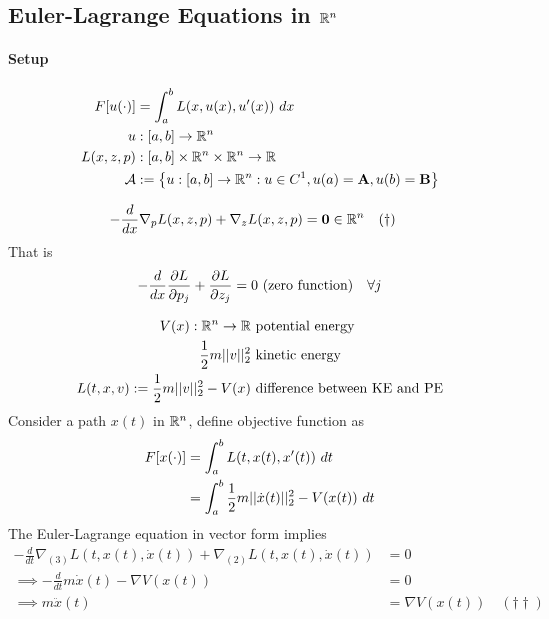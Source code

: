 \documentclass{article}
\begin{document}
	\subsection{Euler-Lagrange Equations in $\mathbb{R}^n$}
	\paragraph{Setup}
	\begin{align}
		F[u(\cdot)] &= \int_a^b L(x, u(x), u'(x))\ dx \\
		u &: [a, b] \to \mathbb{R}^n \\
		L(x, z, p) &: [a, b] \times \mathbb{R}^n \times \mathbb{R}^n \to \mathbb{R} \\
		\mathcal{{A}} &:= \left\{
			u: [a, b] \to \mathbb{R}^n: u \in C^1, u(a) = \textbf{A}, u(b) = \textbf{B}
		\right\}
	\end{align}

	\begin{theorem}
		\begin{align}
			- \frac{d}{dx} \nabla_p L(x, z, p) + \nabla_z L(x, z, p) &= \textbf{0} \in \mathbb{R}^n \quad (\dagger)
		\end{align}
		That is
		\begin{align}
			- \frac{d}{dx}\frac{\partial{L}}{\partial{p_j}} + \frac{\partial{L}}{\partial{z_j}} = 0\text{{ (zero function)}}\quad \forall j
		\end{align}
	\end{theorem}
	
	\begin{example}
		\begin{align}
			V(x): \mathbb{R}^n \to \mathbb{R} &\text{{ potential energy}} \\
			\frac{1}{2} m \vert \vert {v} \vert \vert_2^2 &\text{{ kinetic energy}} \\
			L(t, x, v):= \frac{1}{2} m \vert \vert {v} \vert \vert_2^2 - V(x) &\text{{ difference between KE and PE}}
		\end{align}
		Consider a path $x(t)$ in $\mathbb{R}^n$, define objective function as
		\begin{align}
			F[x(\cdot)] &= \int_a^b L(t, x(t), x'(t))\ dt \\
			&= \int_a^b \frac{1}{2} m \vert \vert {\dot{x}(t)} \vert \vert_2^2 - V(x(t))\ dt
		\end{align}
		The Euler-Lagrange equation in vector form implies
		\begin{align}
			- \frac{d}{dt} \nabla_{(3)} L(t, x(t), \dot{x}(t))
			+ \nabla_{(2)} L(t, x(t), \dot{x}(t)) &= 0 \\
			\implies - \frac{d}{dt} m \dot{x}(t) - \nabla V(x(t)) &= 0 \\
			\implies m \ddot{x}(t) &= \nabla V(x(t))\quad (\dagger \dagger)
		\end{align}
	\end{example}
	
\end{document}
